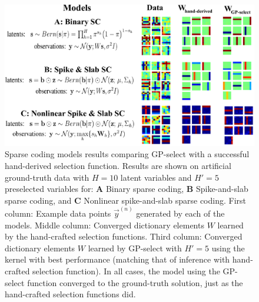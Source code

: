 \begin{figure}[h!]
\begin{center}
\includegraphics[width=.8\textwidth]{sparsecoding/bars-test_transpose.pdf}%
\caption{Sparse coding models results comparing GP-select with a successful hand-derived selection function.
Results are shown on artificial ground-truth data with $H=10$ latent variables and $H'=5$ preselected variables for: \textbf{A} Binary sparse coding, \textbf{B} Spike-and-slab sparse coding, and \textbf{C} Nonlinear spike-and-slab sparse coding.
First column: Example data points $\vec{y}^{(n)}$ generated by each of the models.
Middle column: Converged dictionary elements $W$ learned by the hand-crafted selection functions.
Third column: Converged dictionary elements $W$ learned by GP-select with $H'=5$ using the kernel with best performance (matching that of inference with hand-crafted selection function).
In all cases, the model using the GP-select function converged to the ground-truth solution, just as the hand-crafted selection functions did.
}\label{fig:sparse}
\end{center}
\end{figure}

